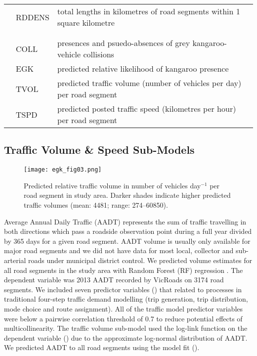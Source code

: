 \begin{table}[htp]
\begin{tabularx}{0.9\textwidth}{llY}
           		 &RDDENS      &total lengths in kilometres of road segments within 1 square kilometre\\
&&\\
&&\\
  		 &COLL        &presences and psuedo-absences of grey kangaroo-vehicle collisions\\
           		 &EGK         &predicted relative likelihood of kangaroo presence\\
           		 &TVOL        &predicted traffic volume (number of vehicles per day) per road segment\\
           		 &TSPD        &predicted posted traffic speed (kilometres per hour) per road segment\\
\bottomrule
\end{tabularx}
\label{egk_variables}
\end{table}

\subsection{Traffic Volume \& Speed Sub-Models}

\begin{figure*}[htp]
  \centering
  \texttt{[image: egk\_fig03.png]}
  \caption[Predicted relative traffic volume in Victoria]{Predicted relative traffic volume in number of vehicles day$^{-1}$ per road segment in study area. Darker shades indicate higher predicted traffic volumes (mean: 4481; range: 274--60850).}
  \label{egk_tvolmap}
\end{figure*}

Average Annual Daily Traffic (AADT) represents the sum of traffic travelling in both directions which pass a roadside observation point during a full year divided by 365 days for a given road segment. AADT volume is usually only available for major road segments and we did not have data for most local, collector and sub-arterial roads under municipal district control. We predicted volume estimates for all road segments in the study area with Random Forest (RF) regression \citep{brei01}. The dependent variable was 2013 AADT recorded by VicRoads on 3174 road segments. We included seven predictor variables () that related to processes in traditional four-step traffic demand modelling (trip generation, trip distribution, mode choice and route assignment). All of the traffic model predictor variables were below a pairwise correlation threshold of 0.7 to reduce potential effects of multicollinearity. The traffic volume sub-model used the log-link function on the dependent variable () due to the approximate log-normal distribution of AADT. We predicted AADT to all road segments using the model fit ().


